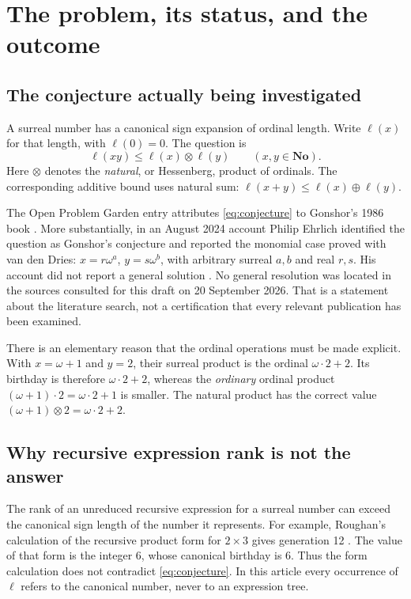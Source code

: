 \documentclass[11pt,letterpaper]{article}
\theoremstyle{definition}
\theoremstyle{remark}
\newcommand{\No}{\mathbf{No}}
\newcommand{\bd}{\ell}
\newcommand{\ns}{\mathbin{\oplus}}
\newcommand{\np}{\mathbin{\otimes}}
\begin{document}
\tableofcontents
\newpage

\section{The problem, its status, and the outcome}

\subsection{The conjecture actually being investigated}
A surreal number has a canonical sign expansion of ordinal length. Write
\(\bd(x)\) for that length, with \(\bd(0)=0\). The question is
\begin{equation}\label{eq:conjecture}
 \boxed{\quad \bd(xy)\leq\bd(x)\np\bd(y)
          \qquad(x,y\in\No).\quad}
\end{equation}
Here \(\np\) denotes the \emph{natural}, or Hessenberg, product of ordinals.
The corresponding additive bound uses natural sum:
\(\bd(x+y)\leq\bd(x)\ns\bd(y)\).

The Open Problem Garden entry attributes \eqref{eq:conjecture} to
Gonshor's 1986 book \cite{Gonshor,OPG}. More substantially, in an
August 2024 account Philip Ehrlich identified the question as Gonshor's
conjecture and reported the monomial case proved with van den Dries:
\(x=r\omega^a\), \(y=s\omega^b\), with arbitrary surreal \(a,b\)
and real \(r,s\). His account did not report a general solution
\cite{EhrlichMO}. No general resolution was located in the sources
consulted for this draft on 20 September 2026. That is a statement about
the literature search, not a certification that every relevant publication
has been examined.

There is an elementary reason that the ordinal operations must be made
explicit. With \(x=\omega+1\) and \(y=2\), their surreal product is the
ordinal \(\omega\cdot2+2\). Its birthday is therefore
\(\omega\cdot2+2\), whereas the \emph{ordinary} ordinal product
\((\omega+1)\cdot2=\omega\cdot2+1\) is smaller. The natural product
has the correct value \((\omega+1)\np2=\omega\cdot2+2\).

\subsection{Why recursive expression rank is not the answer}
The rank of an unreduced recursive expression for a surreal number can
exceed the canonical sign length of the number it represents. For example,
Roughan's calculation of the recursive product form for \(2\times3\)
gives generation 12 \cite{Roughan}. The value of that form is the integer
6, whose canonical birthday is 6. Thus the form calculation does not
contradict \eqref{eq:conjecture}. In this article every occurrence of
\(\bd\) refers to the canonical number, never to an expression tree.
\end{document}
